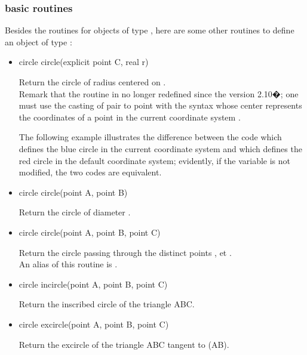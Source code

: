 \documentclass[pdftex]{article}
\begin{document}
\subsubsection{basic routines}
Besides the routines for objects of type , here are some
other routines to define an object of type :
\begin{itemize}
\item {}%
  \begin{Vcolor}
    circle circle(explicit point C, real r)
  \end{Vcolor}
  Return the circle of radius  centered on .\\
  Remark that the routine  in no
  longer redefined since the \asymptote version 2{.}10�; one must use
  the casting of pair to point with the syntax 
  whose center  represents the coordinates of a point in the
  current coordinate system .

  The following example illustrates the difference between the code
   which defines the blue circle in the
  current coordinate system and
  which defines the red circle in the default coordinate system;
  evidently, if the variable  is not modified,
  the two codes are equivalent.
\item {}%
  \begin{Vcolor}
    circle circle(point A, point B)
  \end{Vcolor}
  Return the circle of diameter .
\item {}%
  \begin{Vcolor}
    circle circle(point A, point B, point C)
  \end{Vcolor}
  Return the circle passing through the distinct
  points ,  et .\\
  An alias of this routine is .
\item {}%
  \begin{Vcolor}
    circle incircle(point A, point B, point C)
  \end{Vcolor}
  Return the inscribed circle of the triangle ABC.
\item {}%
  \begin{Vcolor}
    circle excircle(point A, point B, point C)
  \end{Vcolor}
  Return the excircle of the triangle ABC tangent to (AB).
\end{itemize}
\end{document}
